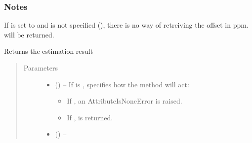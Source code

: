 \documentclass[letterpaper,10pt,english]{sphinxmanual}
\begin{document}
\begin{fulllineitems}
\begin{fulllineitems}
\subsubsection*{Notes}

\sphinxAtStartPar
If  is set to  and  is not specified
(), there is no way of retreiving the offset in ppm.
 will be returned.

\end{fulllineitems}


\begin{fulllineitems}
\label{\detokenize{references/core:nmrespy.core.Estimator.get_result}}
\sphinxAtStartPar
Returns the estimation result
\begin{quote}\begin{description}
\item[{Parameters}] \leavevmode\begin{itemize}
\item {} 
\sphinxAtStartPar
{} (\sphinxstyleliteralemphasis{\sphinxupquote{, }}) – 
\sphinxAtStartPar
If  is ,  specifies how the method will
act:
\begin{itemize}
\item {} 
\sphinxAtStartPar
If , an AttributeIsNoneError is raised.

\item {} 
\sphinxAtStartPar
If ,  is returned.

\end{itemize}


\item {} 
\sphinxAtStartPar
{} (\sphinxstyleliteralemphasis{\sphinxupquote{, }}) – 


\end{itemize}
\end{description}
\end{quote}
\end{fulllineitems}
\end{fulllineitems}
\end{document}
